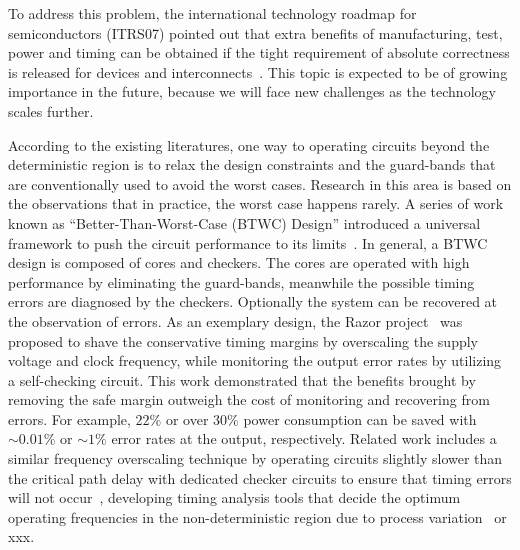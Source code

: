 \documentclass[journal]{IEEEtran}
\begin{document}

To address this problem, the international technology roadmap for semiconductors (ITRS07) pointed out that extra benefits of manufacturing, test, power and timing can be obtained if the tight requirement of absolute correctness is released for devices and interconnects~\cite{semiconductor2007international}. This topic is expected to be of growing importance in the future, because we will face new challenges as the technology scales further.

According to the existing literatures, one way to operating circuits beyond the deterministic region is to relax the design constraints and the guard-bands that are conventionally used to avoid the worst cases. Research in this area is based on the observations that in practice, the worst case happens rarely. A series of work known as ``Better-Than-Worst-Case (BTWC) Design'' introduced a universal framework to push the circuit performance to its limits~\cite{BetterThanWS2005}. In general, a BTWC design is composed of cores and checkers. The cores are operated with high performance by eliminating the guard-bands, meanwhile the possible timing errors are diagnosed by the checkers. Optionally the system can be recovered at the observation of errors. As an exemplary design, the Razor project~\cite{Razor2003,Razor2004} was proposed to shave the conservative timing margins by overscaling the supply voltage and clock frequency, while monitoring the output error rates by utilizing a self-checking circuit. This work demonstrated that the benefits brought by removing the safe margin outweigh the cost of monitoring and recovering from errors. For example, $22\%$ or over $30\%$ power consumption can be saved with $\sim0.01\%$ or $\sim1\%$ error rates at the output, respectively. Related work includes a similar frequency overscaling technique by operating circuits slightly slower than the critical path delay with dedicated checker circuits to ensure that timing errors will not occur~\cite{TEAtime2004}, developing timing analysis tools that decide the optimum operating frequencies in the non-deterministic region due to process variation~\cite{ProbabilisticSTA} or xxx.
\end{document}
